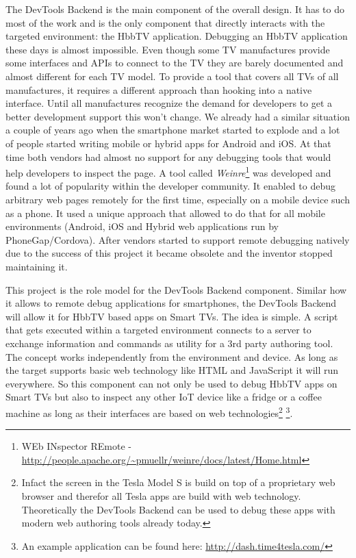 The DevTools Backend is the main component of the overall design. It has to do most of the work and is the only component that directly interacts with the targeted environment: the HbbTV application. Debugging an HbbTV application these days is almost impossible. Even though some TV manufactures provide some interfaces and APIs to connect to the TV they are barely documented and almost different for each TV model. To provide a tool that covers all TVs of all manufactures, it requires a different approach than hooking into a native interface. Until all manufactures recognize the demand for developers to get a better development support this won't change. We already had a similar situation a couple of years ago when the smartphone market started to explode and a lot of people started writing mobile or hybrid apps for Android and iOS. At that time both vendors had almost no support for any debugging tools that would help developers to inspect the page. A tool called \textit{Weinre}\footnote{WEb INspector REmote - \url{http://people.apache.org/~pmuellr/weinre/docs/latest/Home.html}} was developed and found a lot of popularity within the developer community. It enabled to debug arbitrary web pages remotely for the first time, especially on a mobile device such as a phone. It used a unique approach that allowed to do that for all mobile environments (Android, iOS and Hybrid web applications run by PhoneGap/Cordova). After vendors started to support remote debugging natively due to the success of this project it became obsolete and the inventor stopped maintaining it.

This project is the role model for the DevTools Backend component. Similar how it allows to remote debug applications for smartphones, the DevTools Backend will allow it for HbbTV based apps on Smart TVs. The idea is simple. A script that gets executed within a targeted environment connects to a server to exchange information and commands as utility for a 3rd party authoring tool. The concept works independently from the environment and device. As long as the target supports basic web technology like HTML and JavaScript it will run everywhere. So this component can not only be used to debug HbbTV apps on Smart TVs but also to inspect any other IoT device like a fridge or a coffee machine as long as their interfaces are based on web technologies\footnote{Infact the screen in the Tesla Model S is build on top of a proprietary web browser and therefor all Tesla apps are build with web technology. Theoretically the DevTools Backend can be used to debug these apps with modern web authoring tools already today.} \footnote{An example application can be found here: \url{http://dash.time4tesla.com/}}.

